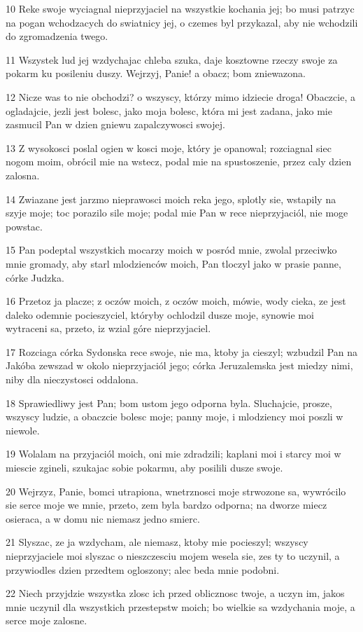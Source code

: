 \par 10 Reke swoje wyciagnal nieprzyjaciel na wszystkie kochania jej; bo musi patrzyc na pogan wchodzacych do swiatnicy jej, o czemes byl przykazal, aby nie wchodzili do zgromadzenia twego.
\par 11 Wszystek lud jej wzdychajac chleba szuka, daje kosztowne rzeczy swoje za pokarm ku posileniu duszy. Wejrzyj, Panie! a obacz; bom zniewazona.
\par 12 Nicze was to nie obchodzi? o wszyscy, którzy mimo idziecie droga! Obaczcie, a ogladajcie, jezli jest bolesc, jako moja bolesc, która mi jest zadana, jako mie zasmucil Pan w dzien gniewu zapalczywosci swojej.
\par 13 Z wysokosci poslal ogien w kosci moje, który je opanowal; rozciagnal siec nogom moim, obrócil mie na wstecz, podal mie na spustoszenie, przez caly dzien zalosna.
\par 14 Zwiazane jest jarzmo nieprawosci moich reka jego, splotly sie, wstapily na szyje moje; toc porazilo sile moje; podal mie Pan w rece nieprzyjaciól, nie moge powstac.
\par 15 Pan podeptal wszystkich mocarzy moich w posród mnie, zwolal przeciwko mnie gromady, aby starl mlodzienców moich, Pan tloczyl jako w prasie panne, córke Judzka.
\par 16 Przetoz ja placze; z oczów moich, z oczów moich, mówie, wody cieka, ze jest daleko odemnie pocieszyciel, któryby ochlodzil dusze moje, synowie moi wytraceni sa, przeto, iz wzial góre nieprzyjaciel.
\par 17 Rozciaga córka Sydonska rece swoje, nie ma, ktoby ja cieszyl; wzbudzil Pan na Jakóba zewszad w okolo nieprzyjaciól jego; córka Jeruzalemska jest miedzy nimi, niby dla nieczystosci oddalona.
\par 18 Sprawiedliwy jest Pan; bom ustom jego odporna byla. Sluchajcie, prosze, wszyscy ludzie, a obaczcie bolesc moje; panny moje, i mlodziency moi poszli w niewole.
\par 19 Wolalam na przyjaciól moich, oni mie zdradzili; kaplani moi i starcy moi w miescie zgineli, szukajac sobie pokarmu, aby posilili dusze swoje.
\par 20 Wejrzyz, Panie, bomci utrapiona, wnetrznosci moje strwozone sa, wywrócilo sie serce moje we mnie, przeto, zem byla bardzo odporna; na dworze miecz osieraca, a w domu nic niemasz jedno smierc.
\par 21 Slyszac, ze ja wzdycham, ale niemasz, ktoby mie pocieszyl; wszyscy nieprzyjaciele moi slyszac o nieszczesciu mojem wesela sie, zes ty to uczynil, a przywiodles dzien przedtem ogloszony; alec beda mnie podobni.
\par 22 Niech przyjdzie wszystka zlosc ich przed oblicznosc twoje, a uczyn im, jakos mnie uczynil dla wszystkich przestepstw moich; bo wielkie sa wzdychania moje, a serce moje zalosne.

